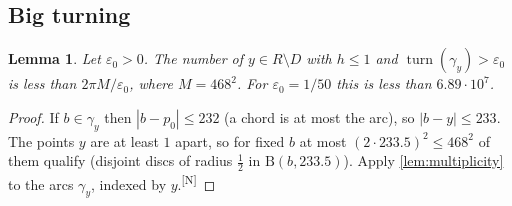 \documentclass[11pt]{amsart}
\newtheorem{lemma}[theorem]{Lemma}
\theoremstyle{definition}
\theoremstyle{remark}
\newcommand{\eps}{\varepsilon}
\newcommand{\turn}{\operatorname{turn}}
\newcommand{\Dd}{\mathrm{B}}      %
\newcommand{\chk}[1]{\textsuperscript{[#1]}}
\begin{document}
\subsection{Big turning}
\begin{lemma}\label{lem:BT}
Let $\eps_0>0$. The number of $y\in R\setminus D$ with $h\le1$ and $\turn(\gamma_y)>\eps_0$ is less than $2\pi M/\eps_0$, where $M=468^2$. For $\eps_0=1/50$ this is less than $6.89\cdot10^7$.
\end{lemma}
\begin{proof}
If $b\in\gamma_y$ then $|b-p_0|\le232$ (a chord is at most the arc), so $|b-y|\le233$. The points $y$ are at least $1$ apart, so for fixed $b$ at most $(2\cdot233.5)^2\le468^2$ of them qualify (disjoint discs of radius $\frac12$ in $\Dd(b,233.5)$). Apply \cref{lem:multiplicity} to the arcs $\gamma_y$, indexed by $y$.\chk{N}
\end{proof}
\end{document}
